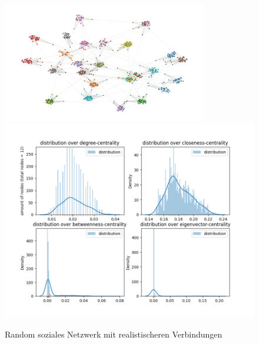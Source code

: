 \FloatBarrier
\begin{figure}[h!]%
  \centering
  \includegraphics[width=0.8\textwidth]{Graphics/newourSN.png}
  \includegraphics[width=1.0\textwidth]{Graphics/newOurDist.png}
  \caption{Random soziales Netzwerk mit realistischeren Verbindungen}
  \label{fig:distributionALL}
\end{figure}
\FloatBarrier
